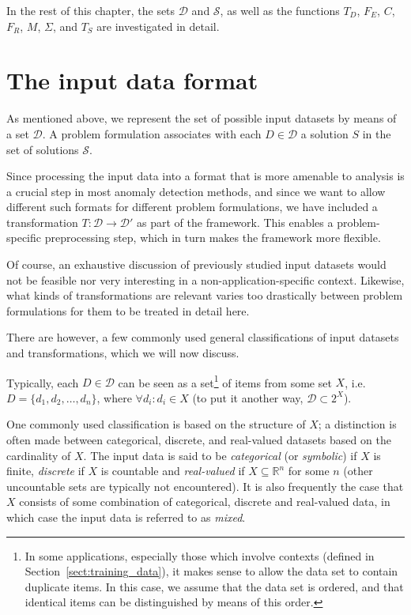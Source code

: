 In the rest of this chapter, the sets $\mathcal{D}$ and $\mathcal{S}$, as well as the functions $T_D$, $F_E$, $C$, $F_R$, $M$, $\Sigma$, and $T_S$ are investigated in detail.

\section{The input data format}
\label{sect:data_format}

As mentioned above, we represent the set of possible input datasets by means of a set $\mathcal{D}$. A problem formulation associates with each $D \in \mathcal{D}$ a solution $S$ in the set of solutions $\mathcal{S}$.

Since processing the input data into a format that is more amenable to analysis is a crucial step in most anomaly detection methods, and since we want to allow different such formats for different problem formulations, we have included a transformation $T: \mathcal{D} \rightarrow \mathcal{D}'$ as part of the framework. This enables a problem-specific preprocessing step, which in turn makes the framework more flexible.

Of course, an exhaustive discussion of previously studied input datasets would not be feasible nor very interesting in a non-application-specific context. Likewise, what kinds of transformations are relevant varies too drastically between problem formulations for them to be treated in detail here.

There are however, a few commonly used general classifications of input datasets and transformations, which we will now discuss.

Typically, each $D \in \mathcal{D}$ can be seen as a set\footnote{In some applications, especially those which involve contexts (defined in Section~\ref{sect:training_data}), it makes sense to allow the data set to contain duplicate items. In this case, we assume that the data set is ordered, and that identical items can be distinguished by means of this order.} of items from some set $X$, i.e.\ $D = \{d_1, d_2, \dots, d_n\}$, where $\forall d_i: d_i \in X$ (to put it another way, $\mathcal{D} \subset 2^X$).

One commonly used classification is based on the structure of $X$; a distinction is often made between categorical, discrete, and real-valued datasets based on the cardinality of $X$. The input data is said to be \emph{categorical} (or \emph{symbolic}) if $X$ is finite, \emph{discrete} if $X$ is countable and \emph{real-valued} if $X \subseteq \mathbb{R}^n$ for some $n$ (other uncountable sets are typically not encountered). It is also frequently the case that $X$ consists of some combination of categorical, discrete and real-valued data, in which case the input data is referred to as \emph{mixed}\cite{TODO}.

